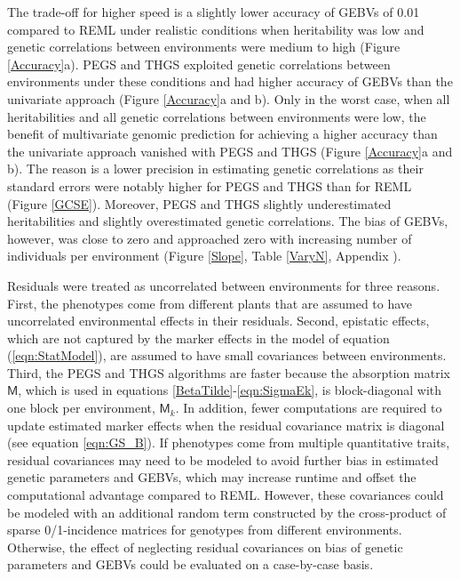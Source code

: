 \documentclass{bmcart}
\newcommand{\mat}[1]{\boldsymbol{\mathsf{#1}}}
\begin{document}
The trade-off for higher speed is a slightly lower accuracy of GEBVs of 0.01 compared to REML under realistic conditions when heritability was low and genetic correlations between environments were medium to high (Figure \ref{Accuracy}a). PEGS and THGS exploited genetic correlations between environments under these conditions and had higher accuracy of GEBVs than the univariate approach (Figure \ref{Accuracy}a and b). Only in the worst case, when all heritabilities and all genetic correlations between environments were low, the benefit of multivariate genomic prediction for achieving a higher accuracy than the univariate approach vanished with PEGS and THGS (Figure \ref{Accuracy}a and b). The reason is a lower precision in estimating genetic correlations as their standard errors were notably higher for PEGS and THGS than for REML (Figure \ref{GCSE}). Moreover, PEGS and THGS slightly underestimated heritabilities and slightly overestimated genetic correlations. The bias of GEBVs, however, was close to zero and approached zero with increasing number of individuals per environment (Figure \ref{Slope}, Table \ref{VaryN}, Appendix \label{AppTab}).

Residuals were treated as uncorrelated between environments for three reasons. First, the phenotypes come from different plants that are assumed to have uncorrelated environmental effects in their residuals. Second, epistatic effects, which are not captured by the marker effects in the model of equation (\ref{eqn:StatModel}), are assumed to have small covariances between environments. Third, the PEGS and THGS algorithms are faster because the absorption matrix $\mat{M}$, which is used in equations \ref{BetaTilde}-\ref{eqn:SigmaEk}, is block-diagonal with one block per environment, $\mat{M}_k$. In addition, fewer computations are required to update estimated marker effects when the residual covariance matrix is diagonal (see equation \ref{eqn:GS_B}). If phenotypes come from multiple quantitative traits, residual covariances may need to be modeled to avoid further bias in estimated genetic parameters and GEBVs, which may increase runtime \cite{Schaeffer} and offset the computational advantage compared to REML. However, these covariances could be modeled with an additional random term constructed by the cross-product of sparse 0/1-incidence matrices for genotypes from different environments. Otherwise, the effect of neglecting residual covariances on bias of genetic parameters and GEBVs could be evaluated on a case-by-case basis.

\end{document}
